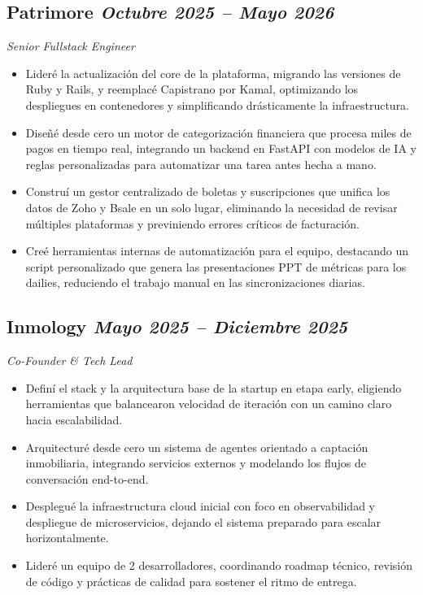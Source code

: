 \documentclass[10pt]{article}
\begin{document}
\subsection*{Patrimore \hfill \textnormal{\textit{Octubre 2025 -- Mayo 2026}}}
\textit{Senior Fullstack Engineer}
\begin{itemize}
  \item Lideré la actualización del core de la plataforma, migrando las versiones de Ruby y Rails, y reemplacé Capistrano por Kamal, optimizando los despliegues en contenedores y simplificando drásticamente la infraestructura.
  \item Diseñé desde cero un motor de categorización financiera que procesa miles de pagos en tiempo real, integrando un backend en FastAPI con modelos de IA y reglas personalizadas para automatizar una tarea antes hecha a mano.
  \item Construí un gestor centralizado de boletas y suscripciones que unifica los datos de Zoho y Bsale en un solo lugar, eliminando la necesidad de revisar múltiples plataformas y previniendo errores críticos de facturación.
  \item Creé herramientas internas de automatización para el equipo, destacando un script personalizado que genera las presentaciones PPT de métricas para los dailies, reduciendo el trabajo manual en las sincronizaciones diarias.
\end{itemize}

\vspace{2em}
\subsection*{Inmology \hfill \textnormal{\textit{Mayo 2025 -- Diciembre 2025}}}
\textit{Co-Founder \& Tech Lead}
\begin{itemize}
  \item Definí el stack y la arquitectura base de la startup en etapa early, eligiendo herramientas que balancearon velocidad de iteración con un camino claro hacia escalabilidad.
  \item Arquitecturé desde cero un sistema de agentes orientado a captación inmobiliaria, integrando servicios externos y modelando los flujos de conversación end-to-end.
  \item Desplegué la infraestructura cloud inicial con foco en observabilidad y despliegue de microservicios, dejando el sistema preparado para escalar horizontalmente.
  \item Lideré un equipo de 2 desarrolladores, coordinando roadmap técnico, revisión de código y prácticas de calidad para sostener el ritmo de entrega.
\end{itemize}
\end{document}

